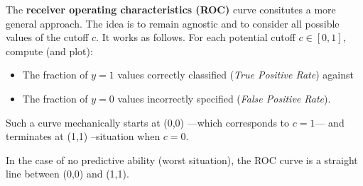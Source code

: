 \documentclass[
  12pt,
]{book}
\providecommand{\tightlist}{%
  \setlength{\itemsep}{0pt}\setlength{\parskip}{0pt}}
\theoremstyle{definition}
\theoremstyle{definition}
\theoremstyle{definition}
\theoremstyle{definition}
\theoremstyle{remark}
\begin{document}
The \textbf{receiver operating characteristics (ROC)} curve consitutes a more general approach. The idea is to remain agnostic and to consider all possible values of the cutoff \(c\). It works as follows. For each potential cutoff \(c \in [0,1]\), compute (and plot):

\begin{itemize}
\tightlist
\item
  The fraction of \(y = 1\) values correctly classified (\emph{True Positive Rate}) against
\item
  The fraction of \(y = 0\) values incorrectly specified (\emph{False Positive Rate}).
\end{itemize}

Such a curve mechanically starts at (0,0) ---which corresponds to \(c=1\)--- and terminates at (1,1) --situation when \(c=0\).

In the case of no predictive ability (worst situation), the ROC curve is a straight line between (0,0) and (1,1).
\end{document}
